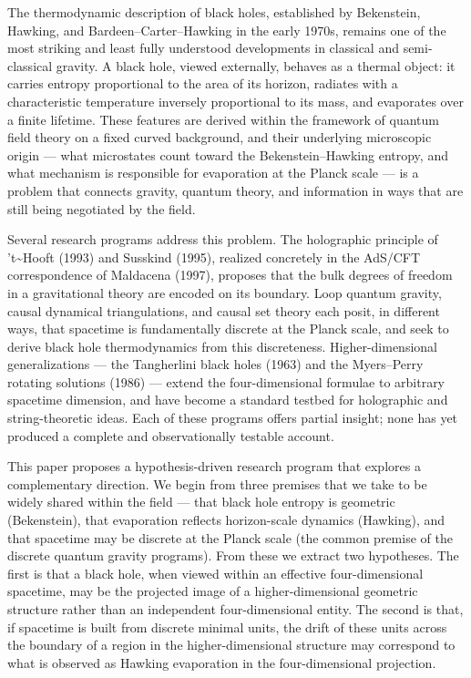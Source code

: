 \documentclass[a4paper,11pt]{article}
\theoremstyle{definition}
\begin{document}
The thermodynamic description of black holes, established by Bekenstein,
Hawking, and Bardeen--Carter--Hawking in the early 1970s, remains one of
the most striking and least fully understood developments in classical
and semi-classical gravity. A black hole, viewed externally, behaves as
a thermal object: it carries entropy proportional to the area of its
horizon, radiates with a characteristic temperature inversely
proportional to its mass, and evaporates over a finite lifetime. These
features are derived within the framework of quantum field theory on a
fixed curved background, and their underlying microscopic origin ---
what microstates count toward the Bekenstein--Hawking entropy, and what
mechanism is responsible for evaporation at the Planck scale --- is a
problem that connects gravity, quantum theory, and information in ways
that are still being negotiated by the field.

Several research programs address this problem. The holographic
principle of 't\textasciitilde Hooft (1993) and Susskind (1995),
realized concretely in the AdS/CFT correspondence of Maldacena (1997),
proposes that the bulk degrees of freedom in a gravitational theory are
encoded on its boundary. Loop quantum gravity, causal dynamical
triangulations, and causal set theory each posit, in different ways,
that spacetime is fundamentally discrete at the Planck scale, and seek
to derive black hole thermodynamics from this discreteness.
Higher-dimensional generalizations --- the Tangherlini black holes
(1963) and the Myers--Perry rotating solutions (1986) --- extend the
four-dimensional formulae to arbitrary spacetime dimension, and have
become a standard testbed for holographic and string-theoretic ideas.
Each of these programs offers partial insight; none has yet produced a
complete and observationally testable account.

This paper proposes a hypothesis-driven research program that explores a
complementary direction. We begin from three premises that we take to be
widely shared within the field --- that black hole entropy is geometric
(Bekenstein), that evaporation reflects horizon-scale dynamics
(Hawking), and that spacetime may be discrete at the Planck scale (the
common premise of the discrete quantum gravity programs). From these we
extract two hypotheses. The first is that a black hole, when viewed
within an effective four-dimensional spacetime, may be the projected
image of a higher-dimensional geometric structure rather than an
independent four-dimensional entity. The second is that, if spacetime is
built from discrete minimal units, the drift of these units across the
boundary of a region in the higher-dimensional structure may correspond
to what is observed as Hawking evaporation in the four-dimensional
projection.
\end{document}
